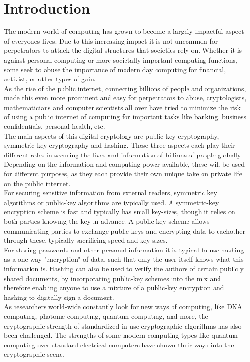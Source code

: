 \section{Introduction}
The modern world of computing has grown to become a largely impactful aspect of everyones lives. Due to this increasing impact it is not uncommon for perpetrators to attack the digital structures that societies rely on. Whether it is against personal computing or more societally important computing functions, some seek to abuse the importance of modern day computing for financial, activist, or other types of gain.\medskip\\
As the rise of the public internet, connecting billions of people and organizations, made this even more prominent and easy for perpetrators to abuse, cryptologists, mathematicians and computer scientists all over have tried to minimize the risk of using a public internet of computing for important tasks like banking, business confidentials, personal health, etc.\medskip\\
The main aspects of this digital cryptology are public-key cryptography, symmetric-key cryptography and hashing. These three aspects each play their different roles in securing the lives and information of billions of people globally. Depending on the information and computing power available, these will be used for different purposes, as they each provide their own unique take on private life on the public internet.\medskip\\
For securing sensitive information from external readers, symmetric key algorithms or public-key algorithms are typically used. A symmetric-key encryption scheme is fast and typically has small key-sizes, though it relies on both parties knowing the key in advance. A public-key scheme allows communicating parties to exchange public keys and encrypting data to eachother through these, typically sacrificing speed and key-sizes.\medskip\\
For storing passwords and other personal information it is typical to use hashing as a one-way "encryption" of data, such that only the user itself knows what this information is. Hashing can also be used to verify the authors of certain publicly shared documents, by incorporating public-key schemes into the mix and therefore enabling anyone to use a mixture of a public-key encryption and hashing to digitally sign a document.\medskip\\
As researchers world-wide constantly look for new ways of computing, like DNA computing, photonic computing, quantum computing, and more, the cryptographic strength of standardized in-use cryptographic algorithms has also been challenged. The strengths of some modern computing-types like quantum computing over standard electrical computers have shown their ways into the cryptographic scene.\medskip\\
